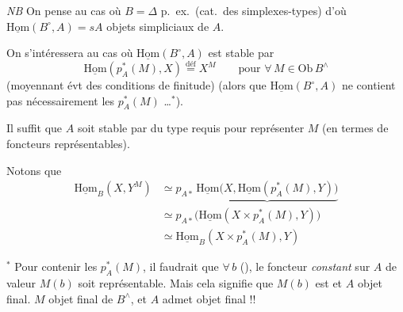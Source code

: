 \documentclass[11pt,a4paper]{article}
\begin{document}


\emph{NB} On pense au cas où $B = \Delta$ p.\ ex.\ (cat.\ des
simplexes-types) d'où $\underline{\mathrm{Hom}}(B^{\circ}, A) = sA$ objets
simpliciaux de $A$.


 On s'intéressera \struck{\ill{}} au cas où
$\underline{\mathrm{Hom}}(B^{\circ}, A)$ est stable par
\[
\underline{\mathrm{Hom}}(p_A^{*}(M), X) \overset{\text{déf}}{=} X^{M}
\qquad \text{pour } \forall\, M \in \mathrm{Ob}\, B^{\wedge}
\]
(moyennant évt des conditions de finitude) (alors que
$\underline{\mathrm{Hom}}(B^{\circ}, A)$ ne contient pas nécessairement les
$p_A^{*}(M)$ \ldots${}^{*}$).

Il suffit que $A$ soit stable par  du type requis
 pour représenter $M$ (en termes de foncteurs représentables).

Notons que 
\[
\begin{aligned}
\underline{\mathrm{Hom}}_B(X, Y^{M})
&\simeq p_{A*}\, \underbrace{\underline{\mathrm{Hom}}\bigl(X, \underline{\mathrm{Hom}}(p_A^{*}(M), Y)\bigr)}\\
&\simeq p_{A*}\bigl(\underline{\mathrm{Hom}}(X \times p_A^{*}(M), Y)\bigr)\\
&\simeq \underline{\mathrm{Hom}}_B(X \times p_A^{*}(M), Y)
\end{aligned}
\]

${}^{*}$ Pour contenir les $p_A^{*}(M)$, il faudrait que $\forall\, b$
\ill{} (), le foncteur \emph{constant} sur $A$
de valeur $M(b)$ soit représentable. Mais cela signifie que $M(b)$ est
\ill{} \ill{} et $A$  objet final.  \ill{} $M$
objet final de $B^{\wedge}$, et $A$ admet objet final !!
\end{document}
